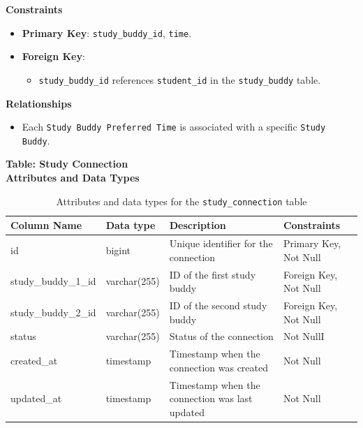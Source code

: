 \documentclass[12pt]{article}
\begin{document}
    \noindent 
    \textbf{Constraints} 
    \begin{itemize} 
        \item \textbf{Primary Key}: \texttt{study\_buddy\_id}, \texttt{time}. 
        \item \textbf{Foreign Key}: \begin{itemize} \item \texttt{study\_buddy\_id} references \texttt{student\_id} in the \texttt{study\_buddy} table. 
        \end{itemize} 
    \end{itemize}

    \noindent 
    \textbf{Relationships} 
    \begin{itemize} 
        \item Each \texttt{Study Buddy Preferred Time} is associated with a specific \texttt{Study Buddy}. 
    \end{itemize} 

    \textbf{Table: Study Connection} \\

    \textbf{Attributes and Data Types}
    \begin{table}[H] 
        \centering 
        \renewcommand{\arraystretch}{1.5} 
        \begin{tabular}{|l|l|p{4.5cm}|l|} 
        \hline 
        \rowcolor[HTML]{96FFFB} 
        \textbf{Column Name} & \textbf{Data type} & \textbf{Description} & \textbf{Constraints} \\ \hline 
        id & bigint & Unique identifier for the connection & Primary Key, Not Null \\ \hline 
        study\_buddy\_1\_id & varchar(255) & ID of the first study buddy & Foreign Key, Not Null \\ \hline 
        study\_buddy\_2\_id & varchar(255) & ID of the second study buddy & Foreign Key, Not Null \\ \hline 
        status & varchar(255) & Status of the connection & Not NullI \\ \hline 
        created\_at & timestamp & Timestamp when the connection was created & Not Null \\ \hline 
        updated\_at & timestamp & Timestamp when the connection was last updated & Not Null \\ \hline 
        \end{tabular} 
        \caption{Attributes and data types for the \texttt{study\_connection} table} 
    \end{table}
\end{document}
